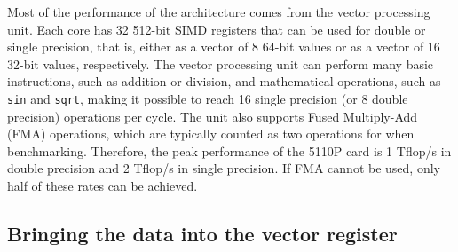 \documentclass[10pt,conference,compsocconf]{IEEEtran}
\begin{document}
Most of the performance of the architecture comes from the vector
processing unit. Each core has 32 512-bit SIMD registers that can be
used for double or single precision, that is, either as a vector of 8
64-bit values or as a vector of 16 32-bit values, respectively. The
vector processing unit can perform many basic instructions, such as
addition or division, and mathematical operations, such as {\tt sin} and
{\tt sqrt}, making it possible to reach 16 single precision (or 8 double precision)
operations per cycle.  
The unit also supports Fused Multiply-Add (FMA)
operations, which are typically counted as two operations for
when benchmarking. Therefore, the peak performance of the 5110P
card is 1 Tflop/s in double precision and 2 Tflop/s in single
precision. If FMA cannot be used, only half of these rates can be
achieved.


\subsection{Bringing the data into the vector register}
\end{document}
